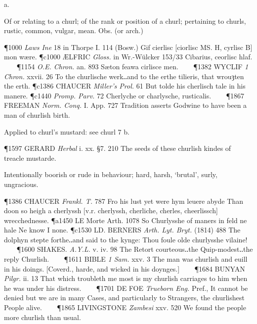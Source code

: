 \begin{description}[wide, labelwidth=!, labelindent=0pt]
 a.

\noindent {}

\vspace{-0.3cm}

\begin{myenumerate}

 Of or relating to a churl; of the rank or position of a churl; pertaining to churls, rustic, common, vulgar, mean. Obs. (or arch.)

\P 1000 \textit{Laws  Ine} 18 in Thorpe I. 114 (Bosw.) Gif cierlisc [ciorlisc MS. H, cyrlisc B] mon  wære.
\P c1000 ÆLFRIC  \textit{Gloss.} in Wr.-Wülcker 153/33 Cibarius, ceorlisc hlaf.    
\P 1154 \textit{O.E.  Chron.} an. 893 Sæton feawa cirlisce men.    
\P 1382 WYCLIF  \textit{1 Chron.} xxvii. 26 To the churlische werk‥and to the erthe tilieris, that wrouȝten the erth.
\P c1386 CHAUCER  \textit{Miller's Prol.} 61 But tolde his cherlisch tale in his manere.
\P c1440  \textit{Promp. Parv.} 72 Cherlyche or charlysche, rusticalis.    
\P 1867 FREEMAN  \textit{Norm. Conq.} I. App. 727 Tradition asserts Godwine to have been a man of churlish birth.

 Applied to churl's mustard: see churl 7 b.

\P 1597 GERARD  \textit{Herbal} i. xx. §7. 210 The seeds of these churlish kindes of treacle mustarde.

 Intentionally boorish or rude in behaviour; hard, harsh, ‘brutal’, surly, ungracious.

\P 1386 CHAUCER  \textit{Frankl. T.} 787 Fro his lust yet were hym leuere abyde Than doon so heigh a cherlyssh [v.r. cherlyssh, cherliche, cherles, cheerlissch] wrecchednesse.
\P a1450 LE Morte Arth. 1078 So Churlysshe  of maners in feld ne hale Ne know I none.
\P c1530 LD. BERNERS  \textit{Arth. Lyt. Bryt.} (1814) 488 The dolphyn stepte forthe‥and said to the kynge: Thou foule olde churlysshe vilaine!    
\P 1600 SHAKES.  \textit{A.Y.L.} v. iv. 98 The Retort courteous‥the Quip-modest‥the reply Churlish.    
\P 1611 BIBLE  \textit{1 Sam.} xxv. 3 The man was churlish and euill in his doings. [Coverd., harde, and wicked in his doynges.]    
\P 1684 BUNYAN  \textit{Pilgr.} ii. 13 That which troubleth me most is my churlish carriages to him when he was under his distress.    
\P 1701 DE FOE  \textit{Trueborn Eng.} Pref., It cannot be denied but we are in many Cases, and particularly to Strangers, the churlishest People alive.    
\P 1865 LIVINGSTONE  \textit{Zambesi} xxv. 520 We found the people more churlish than usual.


\end{myenumerate}
\end{description}
